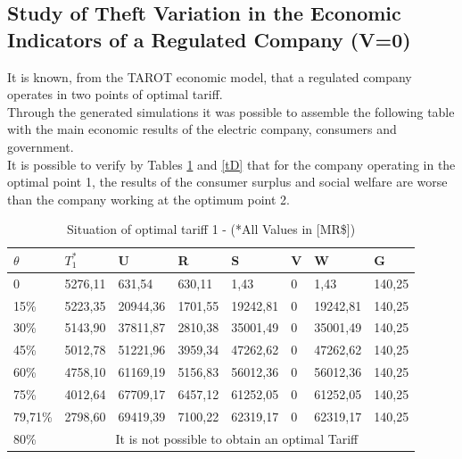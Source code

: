 \documentclass[10pt, letterpaper]{elsarticle}
\begin{document}
\subsection{Study of Theft Variation in the Economic Indicators of a Regulated Company (V=0)}
\label{sec4-4}
It is known, from the TAROT economic model, that a regulated company operates in two points of optimal tariff. \\
Through the generated simulations it was possible to assemble the following table with the main economic results of the electric company, consumers and government. \\
It is possible to verify by Tables \ref {tC} and \ref {tD} that for the company operating in the optimal point 1, the results of the consumer surplus and social welfare are worse than the company working at the optimum point 2. \\

\begin{table}[h]%
\centering
\caption{Situation of optimal tariff 1 - (*All Values in [MR\$])}

\begin{tabular}{p{15mm}p{15mm}p{15mm}p{15mm}p{15mm}p{6mm}p{15mm}p{15mm}}%
\hline
$\theta $&$T_1^*$&U&R&S&V&W&G\\
\hline
0&5276,11&631,54&630,11&1,43&0&1,43&140,25\\
15\%&5223,35&20944,36&1701,55&19242,81&0&19242,81&140,25\\
30\%&5143,90&37811,87&2810,38&35001,49&0&35001,49&140,25\\
45\%&5012,78&51221,96&3959,34&47262,62&0&47262,62&140,25\\
60\%&4758,10&61169,19&5156,83&56012,36&0&56012,36&140,25\\
75\%&4012,64&67709,17&6457,12&61252,05&0&61252,05&140,25\\
79,71\%&2798,60&69419,39&7100,22&62319,17&0&62319,17&140,25\\
80\%&\multicolumn{7}{c}{It is not possible to obtain an optimal Tariff}\\

\hline
\end{tabular}

\label{tC}
\end{table}
\end{document}
